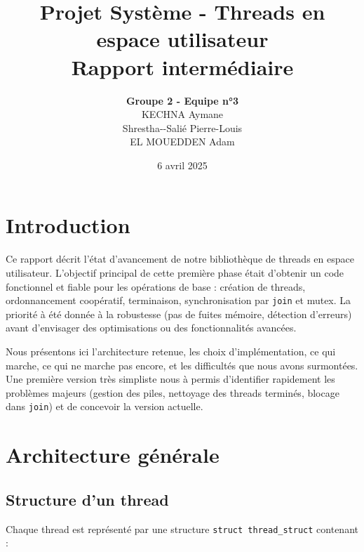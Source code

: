 \documentclass[12pt,a4paper]{article}
\title{Projet Système - Threads en espace utilisateur\\
Rapport intermédiaire}
\author{\textbf{Groupe 2 - Equipe n°3}\\
  KECHNA Aymane  \\
  Shrestha{-}{-}Salié Pierre-Louis \\
  EL MOUEDDEN Adam}
\date{6 avril 2025}
\begin{document}
\maketitle

\section{Introduction}

Ce rapport décrit l’état d’avancement de notre bibliothèque de threads en espace utilisateur. L’objectif principal de cette première phase était d’obtenir un code fonctionnel et fiable pour les opérations de base : création de threads, ordonnancement coopératif, terminaison, synchronisation par \texttt{join} et mutex. La priorité à été donnée à la robustesse (pas de fuites mémoire, détection d’erreurs) avant d’envisager des optimisations ou des fonctionnalités avancées.

Nous présentons ici l’architecture retenue, les choix d’implémentation, ce qui marche, ce qui ne marche pas encore, et les difficultés que nous avons surmontées. Une première version très simpliste nous à permis d’identifier rapidement les problèmes majeurs (gestion des piles, nettoyage des threads terminés, blocage dans \texttt{join}) et de concevoir la version actuelle.

\section{Architecture générale}

\subsection{Structure d’un thread}

Chaque thread est représenté par une structure \texttt{struct thread\_struct} contenant :
\end{document}
